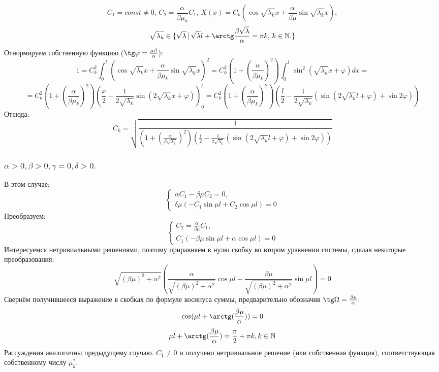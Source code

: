 \documentclass[12pt, a4paper]{report}
\begin{document}
\[ C_{1} = const \ne 0, \, C_{2} = \frac{\alpha}{\beta \mu_{k}} C_{1}, \, X(x) = C_{k} (\cos \sqrt{\lambda_{k}} x + \frac{\alpha}{\beta \mu} \sin \sqrt{\lambda_{k}} x), \]
\[ \sqrt{\lambda_{k}} \in \{ \sqrt{\lambda} \, | \, \sqrt{\lambda} l + \arctg \frac{\beta \sqrt{\lambda}}{\alpha} = \pi k, \, k \in \mathbb{N}. \} \]
Отнормируем собственную функцию ($\tg \varphi = \frac{\mu \beta}{\alpha}$):
\[ 1 = C_{k}^2 \int_{0}^{l} (\cos \sqrt{\lambda_{k}} x + \frac{\alpha}{\beta \mu_{k}} \sin \sqrt{\lambda_{k}} x)^2 = C_{k}^2 (1 + (\frac{\alpha}{\beta \mu_{k}})^2) \int_{0}^{l} \sin^2 (\sqrt{\lambda_{k}}x + \varphi) dx = \]
\[ = C_{k}^2 (1 + (\frac{\alpha}{\beta \mu_{k}})^2) (\frac{x}{2} - \frac{1}{2\sqrt{\lambda_{k}}} \sin (2\sqrt{\lambda_{k}}x + \varphi))_{0}^{l} = C_{k}^2 (1 + (\frac{\alpha}{\beta \mu_{k}})^2) (\frac{l}{2} - \frac{1}{2\sqrt{\lambda_{k}}} (\sin (2\sqrt{\lambda_{k}}l + \varphi) + \sin 2\varphi))\]
Отсюда:
\[ C_{k} = \sqrt{\frac{1}{(1 + (\frac{\alpha}{\beta \sqrt{\lambda_{k}}})^2) (\frac{l}{2} - \frac{1}{2\sqrt{\lambda_{k}}} (\sin (2\sqrt{\lambda_{k}}l + \varphi) + \sin 2\varphi))}} \]

\subsubsection{ $ \alpha > 0, \beta > 0, \gamma = 0, \delta > 0. $}
В этом случае:
\begin{displaymath}
	\begin{cases}
		\alpha C_{1} - \beta \mu C_{2} = 0, \\
		\delta \mu ( -C_{1} \sin \mu l + C_{2} \cos \mu l) = 0
	\end{cases}
\end{displaymath}
Преобразуем:
\begin{displaymath}
	\begin{cases}
		C_{2} = \frac{\alpha}{\beta \mu} C_{1}, \\
		C_{1} ( - \beta \mu\sin \mu l +\alpha \cos \mu l) = 0
	\end{cases}
\end{displaymath}
Интересуемся нетривиальными решениями, поэтому приравняем в нулю скобку во втором уравнении системы, сделав некоторые преобразования:
\[ \sqrt{(\beta \mu)^2 + \alpha^2} (\frac{\alpha}{\sqrt{(\beta \mu)^2 + \alpha^2}} \cos \mu l - \frac{\beta \mu}{\sqrt{(\beta \mu)^2 + \alpha^2}} \sin \mu l) = 0 \]
Свернём получившееся выражение в скобках по формуле косинуса суммы, предварительно обозначив $\tg \Omega = \frac{\beta \mu}{\alpha}$:
\[ \cos (\mu l + \arctg(\frac{\beta \mu}{\alpha})) = 0 \]
\[ \mu l + \arctg(\frac{\beta \mu}{\alpha}) = \frac{\pi}{2} + \pi k, k \in \mathbb{N} \]
Рассуждения аналогичны предыдущему случаю. $C_{1} \ne 0$ и получено нетривиальное решение (или собственная функция), соответствующая собственному числу $\mu ^{*}_{k}$.
\end{document}
